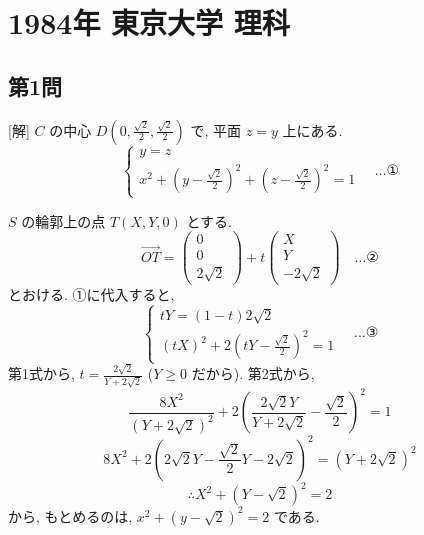\documentclass[../main.tex]{subfiles}
\begin{document}
\section*{1984年 東京大学 理科}

\subsection*{第1問}

[解] $C$ の中心 $D\left(0, \frac{\sqrt{2}}{2}, \frac{\sqrt{2}}{2}\right)$ で, 平面 $z=y$ 上にある.
\[
  \begin{cases}
    y=z \\
    x^2 + \left(y-\frac{\sqrt{2}}{2}\right)^2 + \left(z-\frac{\sqrt{2}}{2}\right)^2 = 1
  \end{cases}
  \quad \dots \text{①}
\]

$S$ の輪郭上の点 $T(X, Y, 0)$ とする.
\[
  \vec{OT} =
  \begin{pmatrix} 0 \\ 0 \\ 2\sqrt{2}
  \end{pmatrix} + t
  \begin{pmatrix} X \\ Y \\ -2\sqrt{2}
  \end{pmatrix} \quad \dots \text{②}
\]
とおける. ①に代入すると,
\[
  \begin{cases}
    t Y = (1-t) 2\sqrt{2} \\
    (t X)^2 + 2 \left(t Y - \frac{\sqrt{2}}{2}\right)^2 = 1
  \end{cases}
  \quad \dots \text{③}
\]
第1式から, $t = \frac{2\sqrt{2}}{Y + 2\sqrt{2}}$ ($Y \ge 0$ だから). 第2式から,
\[
  \frac{8 X^2}{(Y + 2\sqrt{2})^2} + 2 \left( \frac{2\sqrt{2} Y}{Y + 2\sqrt{2}} - \frac{\sqrt{2}}{2} \right)^2 = 1
\]
\[
  8 X^2 + 2 \left( 2\sqrt{2} Y - \frac{\sqrt{2}}{2} Y - 2\sqrt{2} \right)^2 = (Y + 2\sqrt{2})^2
\]
\[
  \therefore X^2 + (Y - \sqrt{2})^2 = 2
\]
から, もとめるのは, $x^2 + (y - \sqrt{2})^2 = 2$ である.

\begin{center}
\end{center}
\end{document}
